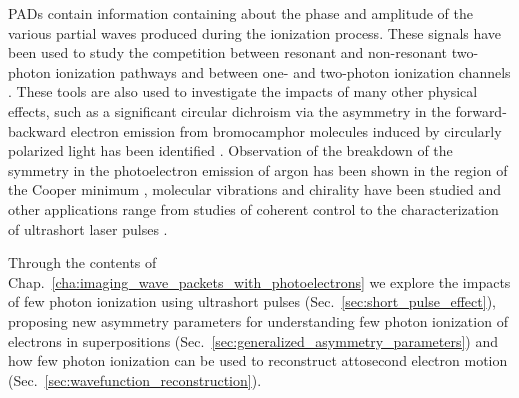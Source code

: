 PADs contain information containing about the phase and amplitude of the various partial waves produced during the ionization process. These signals have been used to study the competition between resonant and non-resonant two-photon ionization pathways \cite{ishikawa2012,ishikawa2013,ma2013} and between one- and two-photon ionization channels \cite{grum-grzhimailo2015,douguet2016,boll2019}.
These tools are also used to investigate the impacts of many other physical effects, such as a significant circular dichroism via the asymmetry in the forward-backward electron emission from bromocamphor molecules induced by circularly polarized light has been identified  \cite{bowering2001}. Observation of the breakdown of the symmetry in the photoelectron emission of argon has been shown in the region of the Cooper minimum \cite{ilchen2018}, molecular vibrations and chirality have been studied \cite{garcia2013} and other applications range from studies of coherent control \cite{prince2016} to the characterization of ultrashort laser pulses \cite{chelkowski2002}.

Through the contents of Chap.~\ref{cha:imaging_wave_packets_with_photoelectrons} we explore the impacts of few photon ionization using ultrashort pulses (Sec.~\ref{sec:short_pulse_effect}), proposing new asymmetry parameters for understanding few photon ionization of electrons in superpositions  (Sec.~\ref{sec:generalized_asymmetry_parameters}) and how few photon ionization can be used to reconstruct attosecond electron motion (Sec.~\ref{sec:wavefunction_reconstruction}).

